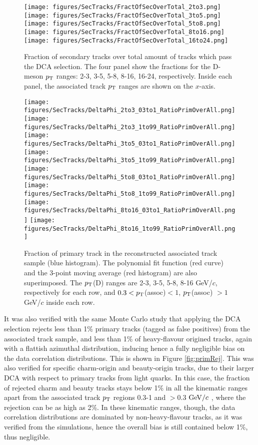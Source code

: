\begin{figure}[h]   %
	\centering
	\texttt{[image: figures/SecTracks/FractOfSecOverTotal\_2to3.png]}
	\texttt{[image: figures/SecTracks/FractOfSecOverTotal\_3to5.png]}
	\texttt{[image: figures/SecTracks/FractOfSecOverTotal\_5to8.png]}
    \texttt{[image: figures/SecTracks/FractOfSecOverTotal\_8to16.png]}
    \texttt{[image: figures/SecTracks/FractOfSecOverTotal\_16to24.png]}
	\caption{Fraction of secondary tracks over total amount of tracks which pass the DCA selection. The four panel show the fractions for the D-meson $p_{\rm T}$ ranges: 2-3, 3-5, 5-8, 8-16, 16-24, respectively. Inside each panel, the associated track $p_{\rm T}$ ranges are shown on the $x$-axis.}
	\label{fig:secnumber}	
\end{figure}

\begin{figure}[h]   %
	\centering
{\texttt{[image: figures/SecTracks/DeltaPhi\_2to3\_03to1\_RatioPrimOverAll.png]}}
{\texttt{[image: figures/SecTracks/DeltaPhi\_2to3\_1to99\_RatioPrimOverAll.png]}}
{\texttt{[image: figures/SecTracks/DeltaPhi\_3to5\_03to1\_RatioPrimOverAll.png]}}
{\texttt{[image: figures/SecTracks/DeltaPhi\_3to5\_1to99\_RatioPrimOverAll.png]}}
{\texttt{[image: figures/SecTracks/DeltaPhi\_5to8\_03to1\_RatioPrimOverAll.png]}}
{\texttt{[image: figures/SecTracks/DeltaPhi\_5to8\_1to99\_RatioPrimOverAll.png]}}
{\texttt{[image: figures/SecTracks/DeltaPhi\_8to16\_03to1\_RatioPrimOverAll.png]}}
{\texttt{[image: figures/SecTracks/DeltaPhi\_8to16\_1to99\_RatioPrimOverAll.png]}}
	\caption{Fraction of primary track in the reconstructed associated track sample (blue histogram). The polynomial fit function (red curve) and the 3-point moving average (red histogram) are also superimposed. The $p_{\rm T}$(D) ranges are 2-3, 3-5, 5-8, 8-16 GeV/$c$, respectively for each row, and $0.3 < p_{\rm T}$(assoc)$ < 1$, $p_{\rm T}$(assoc) $> 1$ GeV/$c$ inside each row.}
	\label{fig:secdPhi}	
\end{figure}

It was also verified with the same Monte Carlo study that applying the DCA selection rejects less than 1\% primary tracks (tagged as false positives) from the associated track sample, and less than 1\% of heavy-flavour origined tracks, again with a flattish azimuthal distribution, inducing hence a fully negligible bias on the data correlation distributions. This is shown in Figure \ref{fig:primRej}. This was also verified for specific charm-origin and beauty-origin tracks, due to their larger DCA with respect to primary tracks from light quarks. In this case, the fraction of rejected charm and beauty tracks stays below 1\% in all the kinematic ranges apart from the associated track $p_{\rm T}$ regions 0.3-1 and $>0.3$ $\mathrm{GeV}/c$ , where the rejection can be as high as 2\%. In these kinematic ranges, though, the data correlation distributions are dominated by non-heavy-flavour tracks, as it was verified from the simulations, hence the overall bias is still contained below 1\%, thus negligible.

